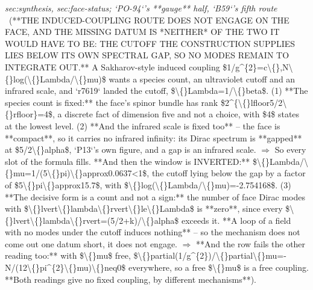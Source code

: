 \begin{description}
\textit{sec:synthesis, sec:face-status; `PO-94`'s **gauge** half, `B59`'s fifth route} \ (**THE INDUCED-COUPLING ROUTE DOES NOT ENGAGE ON THE FACE, AND THE MISSING DATUM IS *NEITHER* OF THE TWO IT WOULD HAVE TO BE: THE CUTOFF THE CONSTRUCTION SUPPLIES LIES BELOW ITS OWN SPECTRAL GAP, SO NO MODES REMAIN TO INTEGRATE OUT.** A Sakharov-style induced coupling \$1/g\textasciicircum{}\{2\}=c\textbackslash\{\},N\textbackslash\{\}log(\textbackslash\{\}Lambda/\textbackslash\{\}mu)\$ wants a species count, an ultraviolet cutoff and an infrared scale, and `r7619` landed the cutoff, \$\textbackslash\{\}Lambda=1/\textbackslash\{\}beta\$. (1) **The species count is fixed:** the face's spinor bundle has rank \$2\textasciicircum{}\{\textbackslash\{\}lfloor5/2\textbackslash\{\}rfloor\}=4\$, a discrete fact of dimension five and not a choice, with \$4\$ states at the lowest level. (2) **And the infrared scale is fixed too** -- the face is **compact**, so it carries no infrared infinity: its Dirac spectrum is **gapped** at \$5/2\textbackslash\{\}alpha\$, `P13`'s own figure, and a gap is an infrared scale. \ensuremath{\Rightarrow} So every slot of the formula fills.  **And then the window is INVERTED:** \$\textbackslash\{\}Lambda/\textbackslash\{\}mu=1/(5\textbackslash\{\}pi)\textbackslash\{\}approx0.0637<1\$, the cutoff lying below the gap by a factor of \$5\textbackslash\{\}pi\textbackslash\{\}approx15.7\$, with \$\textbackslash\{\}log(\textbackslash\{\}Lambda/\textbackslash\{\}mu)=-2.754168\$. (3) **The decisive form is a count and not a sign:** the number of face Dirac modes with \$\textbackslash\{\}lvert\textbackslash\{\}lambda\textbackslash\{\}rvert\textbackslash\{\}le\textbackslash\{\}Lambda\$ is **zero**, since every \$\textbackslash\{\}lvert\textbackslash\{\}lambda\textbackslash\{\}rvert=(5/2+k)/\textbackslash\{\}alpha\$ exceeds it. **A loop of a field with no modes under the cutoff induces nothing** -- so the mechanism does not come out one datum short, it does not engage. \ensuremath{\Rightarrow} **And the row fails the other reading too:** with \$\textbackslash\{\}mu\$ free, \$\textbackslash\{\}partial(1/g\textasciicircum{}\{2\})/\textbackslash\{\}partial\textbackslash\{\}mu=-N/(12\textbackslash\{\}pi\textasciicircum{}\{2\}\textbackslash\{\}mu)\textbackslash\{\}neq0\$ everywhere, so a free \$\textbackslash\{\}mu\$ is a free coupling. **Both readings give no fixed coupling, by different mechanisms**). 

\end{description}
